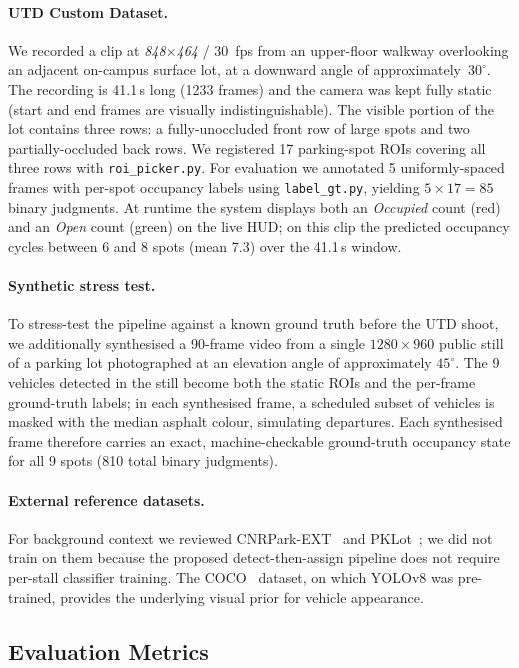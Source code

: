 \documentclass[10pt,twocolumn,letterpaper]{article}
\begin{document}
\paragraph{UTD Custom Dataset.}
We recorded a clip at \emph{848$\times$464} / 30~fps from an
upper-floor walkway overlooking an adjacent on-campus surface lot, at
a downward angle of approximately~$30^{\circ}$. The recording is
41.1\,s long (1233 frames) and the camera was kept fully static
(start and end frames are visually indistinguishable). The visible
portion of the lot contains three rows: a fully-unoccluded front row
of large spots and two partially-occluded back rows. We registered 17
parking-spot ROIs covering all three rows with \texttt{roi\_picker.py}.
For evaluation we annotated 5 uniformly-spaced frames with per-spot
occupancy labels using \texttt{label\_gt.py}, yielding $5 \times 17 =
85$ binary judgments. At runtime the system displays both an
\emph{Occupied} count (red) and an \emph{Open} count (green) on the
live HUD; on this clip the predicted occupancy cycles between 6 and 8
spots (mean 7.3) over the 41.1\,s window.

\paragraph{Synthetic stress test.}
To stress-test the pipeline against a known ground truth before the UTD
shoot, we additionally synthesised a 90-frame video from a single $1280
\times 960$ public still of a parking lot photographed at an elevation
angle of approximately $45^{\circ}$. The 9 vehicles detected in the still
become both the static ROIs and the per-frame ground-truth labels; in each
synthesised frame, a scheduled subset of vehicles is masked with the median
asphalt colour, simulating departures. Each synthesised frame therefore
carries an exact, machine-checkable ground-truth occupancy state for all 9
spots (810 total binary judgments).

\paragraph{External reference datasets.}
For background context we reviewed CNRPark-EXT~\cite{amato2017deep} and
PKLot~\cite{pklot}; we did not train on them because the proposed
detect-then-assign pipeline does not require per-stall classifier training.
The COCO~\cite{lin2014coco} dataset, on which YOLOv8 was pre-trained,
provides the underlying visual prior for vehicle appearance.

\subsection{Evaluation Metrics}
\label{sec:exp:metrics}
\end{document}
